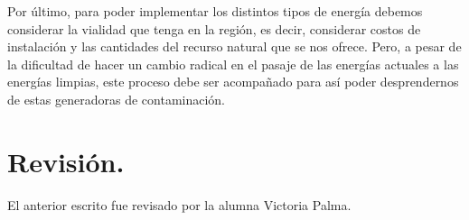 \documentclass[runningheads]{llncs}
\begin{document}
Por último, para poder implementar los distintos tipos de energía debemos considerar la vialidad que tenga en la región, es decir, considerar costos de instalación y las cantidades del recurso natural que se nos ofrece. Pero, a pesar de la dificultad de hacer un cambio radical en el pasaje de las energías actuales a las energías limpias, este proceso debe ser acompañado para así poder desprendernos de estas generadoras de contaminación.

\section{Revisión.}
El anterior escrito fue revisado por la alumna Victoria Palma.
\end{document}
